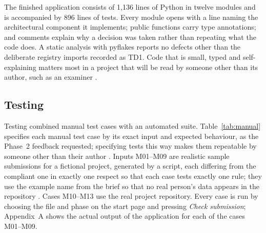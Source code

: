 \documentclass[a4paper,11pt]{article}
\begin{document}
The finished application consists of 1,136 lines of Python in twelve modules and
is accompanied by 896 lines of tests. Every module opens with a line naming the
architectural component it implements; public functions carry type annotations;
and comments explain why a decision was taken rather than repeating what the code
does. A static analysis with pyflakes reports no defects other than the
deliberate registry imports recorded as TD1. Code that is small, typed and
self-explaining matters most in a project that will be read by someone other
than its author, such as an examiner \citep{Winters2020}.

\subsection{Testing}\label{sec:testing}

Testing combined manual test cases with an automated suite. Table~\ref{tab:manual}
specifies each manual test case by its exact input and expected behaviour, as the
Phase~2 feedback requested; specifying tests this way makes them repeatable by
someone other than their author \citep{Winters2020}. Inputs M01--M09 are
realistic sample submissions for a fictional project, generated by a script, each
differing from the compliant one in exactly one respect so that each case tests
exactly one rule; they use the example name from the brief so that no real
person's data appears in the repository \citep{NIST2022}. Cases M10--M13 use the
real project repository. Every case is run by choosing the file and phase on the
start page and pressing \textit{Check submission}; Appendix~A shows the actual
output of the application for each of the cases M01--M09.
\end{document}
